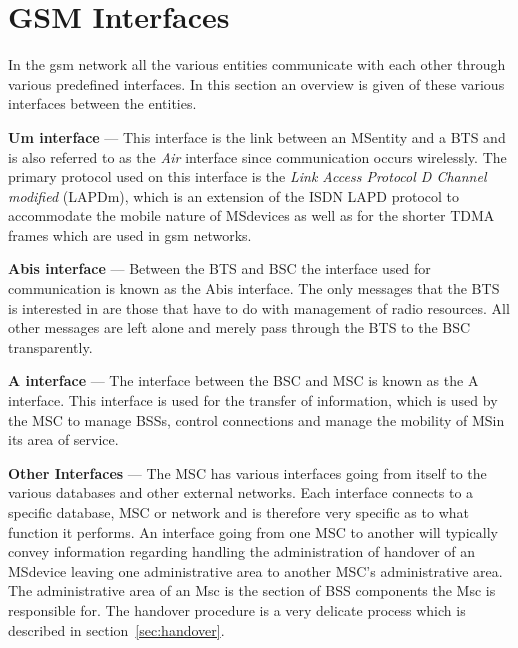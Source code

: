 \section{GSM Interfaces}
\label{sec:gsminterfaces}
In the \gls{gsm} network all the various entities communicate with each other through various predefined interfaces. In this section an overview is given of these various interfaces between the entities.
\begin{description}
\item{\textbf{Um interface}} --- This interface is the link between an \gls{MS}entity and a BTS and is also referred to as the \emph{Air} interface since communication occurs wirelessly. The primary protocol used on this interface is the \emph{Link Access Protocol D Channel modified} (LAPDm), which is an extension of the \gls{ISDN} LAPD protocol to accommodate the mobile nature of \gls{MS}devices as well as for the shorter \gls{TDMA} frames which are used in \gls{gsm} networks\cite{wirelesstelcoMullet,GSMSecurInTeleNetwork}.
\item{\textbf{Abis interface}} --- Between the BTS and BSC the interface used for communication is known as the Abis interface. The only messages that the BTS is interested in are those that have to do with management of radio resources\cite{wirelesstelcoMullet,GSMSecurInTeleNetwork}. All other messages are left alone and merely pass through the BTS to the BSC transparently.
\item{\textbf{A interface}} --- The interface between the BSC and MSC is known as the A interface. This interface is used for the transfer of information, which is used by the MSC to manage BSSs, control connections and manage the mobility of \gls{MS}in its area of service\cite{wirelesstelcoMullet,GSMArchitectureProtocolsServices}.
\item{\textbf{Other Interfaces}} --- The MSC has various interfaces going from itself to the various databases and other external networks. Each interface connects to a specific database, MSC or network and is therefore very specific as to what function it performs\cite{wirelesstelcoMullet,GSMArchitectureProtocolsServices}. An interface going from one MSC to another will typically convey information regarding handling the administration of handover of an \gls{MS}device leaving one administrative area to another MSC's administrative area. The administrative area of an Msc is the section of BSS components the Msc is responsible for. The handover procedure is a very delicate process which is described in section~\ref{sec:handover}.
\end{description}

